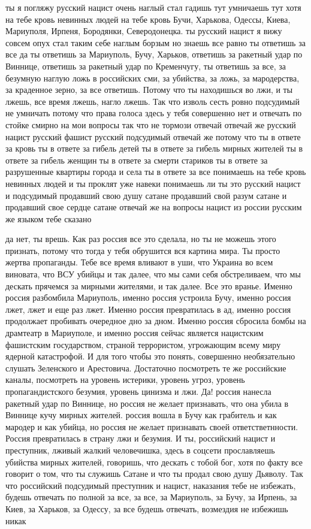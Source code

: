 ты я погляжу русский нацист очень наглый стал гадишь тут умничаешь тут хотя на
тебе кровь невинных людей на тебе кровь Бучи, Харькова, Одессы, Киева,
Мариуполя, Ирпеня, Бородянки, Северодонецка. ты русский нацист я вижу совсем
опух стал таким себе наглым борзым но знаешь все равно ты ответишь за все да ты
ответишь за Мариуполь, Бучу, Харьков, ответишь за ракетный удар по Виннице,
ответишь за ракетный удар по Кременчугу, ты ответишь за все, за безумную наглую
ложь в российских сми, за убийства, за ложь, за мародерства, за краденное
зерно, за все ответишь. Потому что ты находишься во лжи, и ты лжешь, все время
лжешь, нагло лжешь. Так что изволь сесть ровно подсудимый не умничать потому
что права голоса здесь у тебя совершенно нет и отвечать по стойке смирно на мои
вопросы так что не тормози отвечай отвечай же русский нацист русский фашист
русский подсудимый отвечай же потому что ты в ответе за кровь ты в ответе за
гибель детей ты в ответе за гибель мирных жителей ты в ответе за гибель женщин
ты в ответе за смерти стариков ты в ответе за разрушенные квартиры города и
села ты в ответе за все понимаешь на тебе кровь невинных людей и ты проклят уже
навеки понимаешь ли ты это русский нацист и подсудимый продавший свою душу
сатане продавший свой разум сатане и продавший свое сердце сатане отвечай же на
вопросы нацист из россии русским же языком тебе сказано

да нет, ты врешь. Как раз россия все это сделала, но ты не можешь этого
признать, потому что тогда у тебя обрушится вся картина мира. Ты просто жертва
пропаганды. Тебе все время вливают в уши, что Украина во всем виновата, что ВСУ
убийцы и так далее, что мы сами себя обстреливаем, что мы дескать прячемся за
мирными жителями, и так далее. Все это вранье. Именно россия разбомбила
Мариуполь, именно россия устроила Бучу, именно россия лжет, лжет и еще раз
лжет. Именно россия превратилась в ад, именно россия продолжает пробивать
очередное дно за дном. Именно россия сбросила бомбы на драмтеатр в Мариуполе, и
именно россия сейчас является нацистским фашистским государством, страной
террористом, угрожающим всему миру ядерной катастрофой. И для того чтобы это
понять, совершенно необязательно слушать Зеленского и Арестовича. Достаточно
посмотреть те же российские каналы, посмотреть на уровень истерики, уровень
угроз, уровень пропагандистского безумия, уровень цинизма и лжи. Да! россия
нанесла ракетный удар по Виннице, но россия не желает признавать, что она убила
в Виннице кучу мирных жителей. россия вошла в Бучу как грабитель и как мародер
и как убийца, но россия не желает признавать своей ответстветнности. Россия
превратилась в страну лжи и безумия. И ты, российский нацист и преступник,
лживый жалкий человечишка, здесь в соцсети прославляешь убийства мирных
жителей, говоришь, что дескать с тобой бог, хотя по факту все говорит о том,
что ты служишь Сатане и что ты продал свою душу Дьяволу. Так что российский
подсудимый преступник и нацист, наказания тебе не избежать, будешь отвечать по
полной за все, за все, за Мариуполь, за Бучу, за Ирпень, за Киев, за Харьков,
за Одессу, за все будешь отвечать, возмездия не избежишь никак

